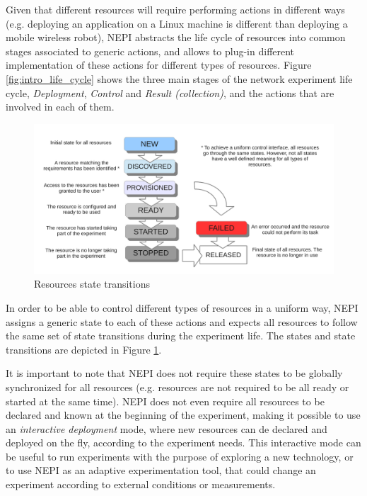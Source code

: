 Given that different resources will require performing actions in 
different ways (e.g. deploying an application on 
a Linux machine is different than deploying a mobile wireless robot), 
NEPI abstracts the life cycle of resources into common stages associated
to generic actions, and allows to plug-in different implementation of 
these actions for different types of resources.
Figure \ref{fig:intro_life_cycle} shows the three
main stages of the network experiment life cycle, \emph{Deployment}, 
\emph{Control} and \emph{Result (collection)}, and the actions that are 
involved in each of them. 

\begin{figure}[h]
  \centering
  \includegraphics[width=\textwidth]{intro_state_transitions}
  \caption{Resources state transitions}
  \label{fig:intro_state_transitions}
\end{figure}

In order to be able to control different types of resources in 
a uniform way, NEPI assigns a generic state to each of these
actions and expects all resources to follow the same set of
state transitions during the experiment life. The states and
state transitions are depicted in Figure 
\ref{fig:intro_state_transitions}.

It is important to note that NEPI does not require these states
to be globally synchronized for all resources (e.g. resources
are not required to be all ready or started at the same time).
NEPI does not even require all resources to be declared and known 
at the beginning of the experiment, making it possible to use 
an \emph{interactive deployment} mode, where new resources can de 
declared and deployed on the fly, according to the experiment needs.
This interactive mode can be useful to run experiments with the 
purpose of exploring a new technology, or to use NEPI as an adaptive
experimentation tool, that could change an experiment according to
external conditions or measurements. 

